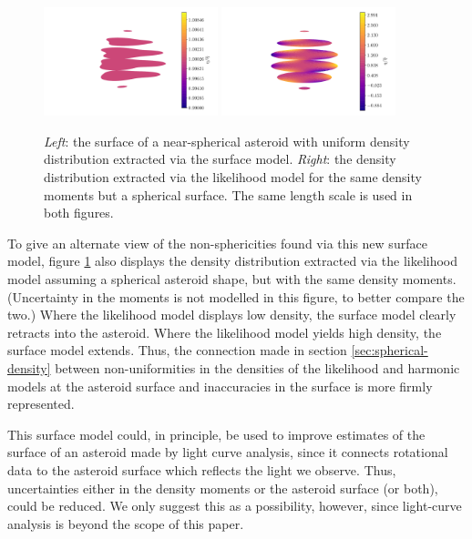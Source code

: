 \documentclass[fleqn,usenatbib]{mnras}
\begin{document}
\begin{figure}
  \centering
  \includegraphics[width=0.45\textwidth]{figs/high-surface.pdf}\hfill
  \includegraphics[width=0.45\textwidth]{figs/high-likelihood.pdf}
  \caption{\textit{Left}: the surface of a near-spherical asteroid with uniform density distribution extracted via the surface model. \textit{Right}: the density distribution extracted via the likelihood model for the same density moments but a spherical surface. The same length scale is used in both figures.}
  \label{fig:surface-density}
\end{figure}

To give an alternate view of the non-sphericities found via this new surface model, figure \ref{fig:surface-density} also displays the density distribution extracted via the likelihood model assuming a spherical asteroid shape, but with the same density moments. (Uncertainty in the moments is not modelled in this figure, to better compare the two.) Where the likelihood model displays low density, the surface model clearly retracts into the asteroid. Where the likelihood model yields high density, the surface model extends. Thus, the connection made in section \ref{sec:spherical-density} between non-uniformities in the densities of the likelihood and harmonic models at the asteroid surface and inaccuracies in the surface is more firmly represented.

This surface model could, in principle, be used to improve estimates of the surface of an asteroid made by light curve analysis, since it connects rotational data to the asteroid surface which reflects the light we observe. Thus, uncertainties either in the density moments or the asteroid surface (or both), could be reduced. We only suggest this as a possibility, however, since light-curve analysis is beyond the scope of this paper.
\end{document}
